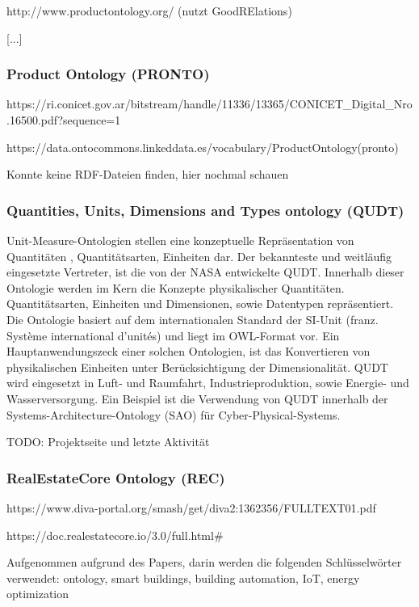 \documentclass{article}
\begin{document}
http://www.productontology.org/ (nutzt GoodRElations)

[...]

\subsubsection{Product Ontology (PRONTO)}

https://ri.conicet.gov.ar/bitstream/handle/11336/13365/CONICET\_Digital\_Nro.16500.pdf?sequence=1

https://data.ontocommons.linkeddata.es/vocabulary/ProductOntology(pronto)

Konnte keine RDF-Dateien finden, hier nochmal schauen

\subsubsection{Quantities, Units, Dimensions and Types ontology (QUDT)}

Unit-Measure-Ontologien stellen eine konzeptuelle Repräsentation von Quantitäten , Quantitätsarten, Einheiten dar. Der bekannteste und weitläufig eingesetzte Vertreter, ist die von der NASA entwickelte QUDT\cite{QUDTOntology}. Innerhalb dieser Ontologie werden im Kern die Konzepte physikalischer Quantitäten. Quantitätsarten, Einheiten und Dimensionen, sowie Datentypen repräsentiert. Die Ontologie basiert auf dem internationalen Standard der SI-Unit (franz. Système international d'unités) und liegt im OWL-Format vor. Ein Hauptanwendungszeck einer solchen Ontologien, ist das Konvertieren von physikalischen  Einheiten unter Berücksichtigung der Dimensionalität.
QUDT wird eingesetzt in Luft- und Raumfahrt, Industrieproduktion, sowie Energie- und Wasserversorgung. Ein Beispiel ist die Verwendung von QUDT innerhalb der Systems-Architecture-Ontology (SAO) für Cyber-Physical-Systems.

TODO: Projektseite und letzte Aktivität

\subsubsection{RealEstateCore Ontology (REC)}

https://www.diva-portal.org/smash/get/diva2:1362356/FULLTEXT01.pdf

https://doc.realestatecore.io/3.0/full.html\#

Aufgenommen aufgrund des Papers, darin werden die folgenden Schlüsselwörter verwendet:  ontology, smart buildings, building automation, IoT, energy optimization
\end{document}
